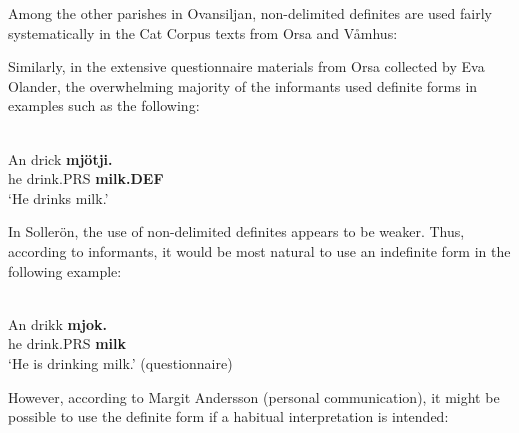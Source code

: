 Among the other parishes in Ovansiljan, non-delimited definites are used fairly systematically in the Cat Corpus texts from Orsa and Våmhus: 

\ea 
	\z 
\z

Similarly, in the extensive questionnaire materials from Orsa collected by Eva Olander, the overwhelming majority of the informants used definite forms in examples such as the following:

\ea \label{} 
\\
\gll An  drick  \textbf{mjötji.}\\
he  drink.PRS  \textbf{milk.DEF}\\
\glt ‘He drinks milk.’

\z

In Sollerön, the use of non-delimited definites appears to be weaker. Thus, according to informants, it would be most natural to use an indefinite form in the following example:

\ea \label{} 
\\
\gll An  drikk  \textbf{mjok.}\\
he  drink.PRS  \textbf{milk}\\
\glt ‘He is drinking milk.’ (questionnaire)

\z

However, according to Margit Andersson (personal communication), it might be possible to use the definite form if a habitual interpretation is intended:

